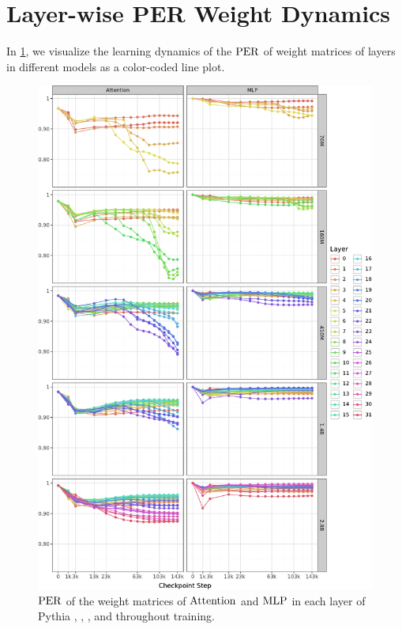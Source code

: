 \section{Layer-wise PER Weight Dynamics}
\label{app:layerwise-per_weight-figures}

In \cref{fig:per_weight-layer-wise-lines}, we visualize the learning dynamics of the $\mathrm{PER}$ of weight matrices of layers in different models as a color-coded line plot. 
\vspace{0.2cm}

\begin{figure}[h!]
    \centering
    \includegraphics[width=0.90\linewidth]{chapters/tending-towards-stability/figures/per_weight_lines.pdf}
    \vspace{-5pt}
    \caption{$\mathrm{PER}$ of the weight matrices of $\mathrm{Attention}$ and $\mathrm{MLP}$ in each layer of Pythia , , ,  and  throughout training.}%
    \label{fig:per_weight-layer-wise-lines}
\end{figure}


